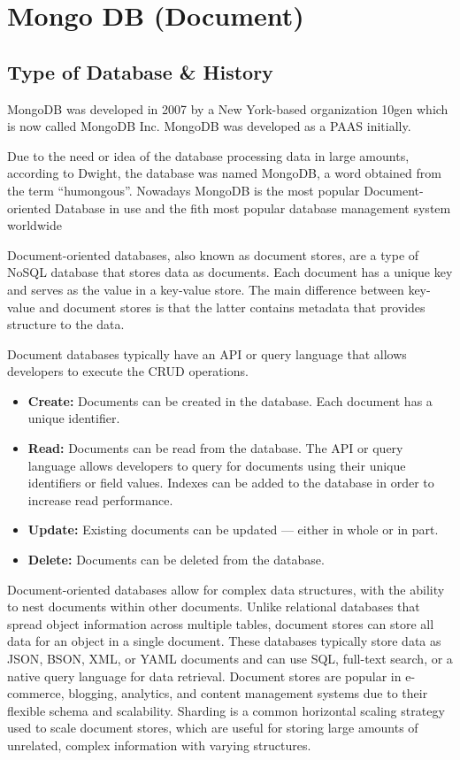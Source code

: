 
\chapter{Mongo DB (Document)} \label{ch:mongo}

\section{Type of Database \& History}
MongoDB was developed in 2007 by a New York-based organization 10gen which is now called MongoDB Inc. MongoDB was developed as a \ac{PAAS} initially.

Due to the need or idea of the database processing data in large amounts, according to Dwight, the database was named MongoDB, a word obtained from the term \enquote{humongous}.
Nowadays MongoDB is the most popular Document-oriented Database in use and the fith most popular database management system worldwide

Document-oriented databases, also known as document stores, are a type of NoSQL database that stores data as documents. Each document has a unique key and serves as the value in a key-value store. The main difference between key-value and document stores is that the latter contains metadata that provides structure to the data.

Document databases typically have an \ac{API} or query language that allows developers to execute the \ac{CRUD} operations.

\begin{itemize}
    \item \textbf{Create:} Documents can be created in the database. Each document has a unique identifier.
    \item \textbf{Read:} Documents can be read from the database. The \ac{API} or query language allows developers to query for documents using their unique identifiers or field values. Indexes can be added to the database in order to increase read performance.
    \item \textbf{Update:} Existing documents can be updated — either in whole or in part.
    \item \textbf{Delete:} Documents can be deleted from the database.
\end{itemize}

Document-oriented databases allow for complex data structures, with the ability to nest documents within other documents. Unlike relational databases that spread object information across multiple tables, document stores can store all data for an object in a single document. These databases typically store data as \ac{JSON}, \ac{BSON}, \ac{XML}, or \ac{YAML} documents and can use \ac{SQL}, full-text search, or a native query language for data retrieval. Document stores are popular in e-commerce, blogging, analytics, and content management systems due to their flexible schema and scalability. Sharding is a common horizontal scaling strategy used to scale document stores, which are useful for storing large amounts of unrelated, complex information with varying structures.

